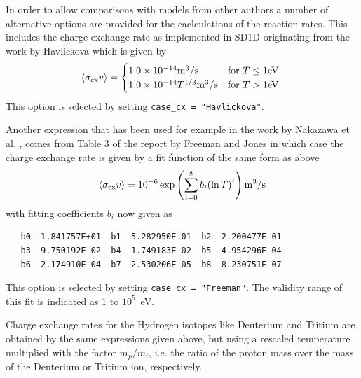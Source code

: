 \documentclass[amsmath,amssymb,a4]{revtex4-2}
\begin{document}
In order to allow comparisons with models from other authors a number of alternative options are provided for the caclculations of the reaction rates. This includes the charge exchange rate as implemented in SD1D originating from the work by Havlickova \cite{havlickova2013} which is given by \cite{SD1D}
\begin{equation}\label{charge_exchange_SD1D}
    \langle\sigma_{\rm cx} v\rangle = \begin{cases} 1.0 \times 10^{-14} {\rm m}^3/{\rm s}             & \mbox{for } T \le 1 {\rm eV} \\
                                        1.0 \times 10^{-14} T^{1/3} {\rm m}^3/{\rm s} & \mbox{for } T >   1 {\rm eV}. \end{cases}
\end{equation}
This option is selected by setting {\tt case\_cx = "Havlickova"}.

Another expression that has been used for example in the work by Nakazawa et al. \cite{nakazawa2000}, comes from Table 3 of the report by Freeman and Jones \cite{freeman1974} in which case the charge exchange rate is given by a fit function of the same form as above
\begin{equation}\label{charge_exchange_FJ}
    \langle\sigma_{\rm cx} v\rangle = 10^{-6} \exp\left( \sum_{i=0}^8 b_i (\ln T)^i \right)  {\rm m}^3/{\rm s}
\end{equation}
with fitting coefficients $b_i$ now given as
\begin{small}\begin{verbatim}
   b0 -1.841757E+01  b1  5.282950E-01  b2 -2.200477E-01
   b3  9.750192E-02  b4 -1.749183E-02  b5  4.954296E-04
   b6  2.174910E-04  b7 -2.530206E-05  b8  8.230751E-07
\end{verbatim}\end{small}
This option is selected by setting {\tt case\_cx = "Freeman"}. The validity range of this fit is indicated as 1 to $10^5$~eV.

Charge exchange rates for the Hydrogen isotopes like Deuterium and Tritium are obtained by the same expressions given above, but using a rescaled temperature multiplied with the factor $m_p/m_i$, i.e. the ratio of the proton mass over the mass of the Deuterium or Tritium ion, respectively.
\end{document}
